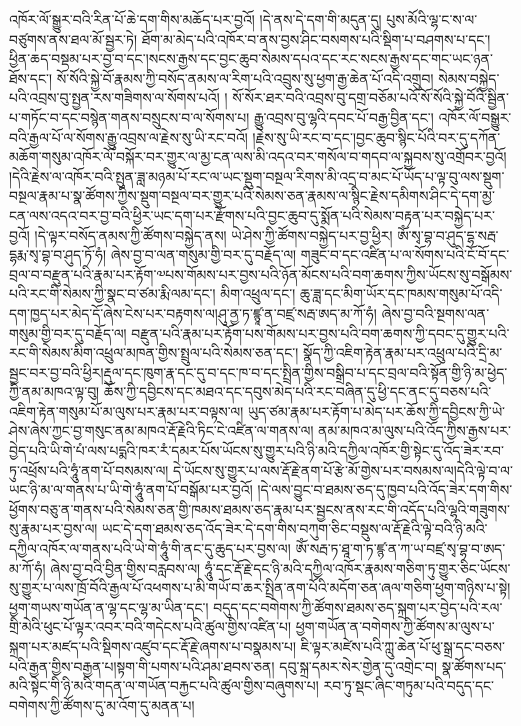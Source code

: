 འཁོར་ལོ་སྒྱུར་བའི་རིན་པོ་ཆེ་དག་གིས་མཆོད་པར་བྱའོ། །དེ་ནས་དེ་དག་གི་མདུན་དུ། པུས་མོའི་ལྷ་ང་ས་ལ་བཙུགས་ནས་ཐལ་མོ་སྦྱར་ཏེ། ཐོག་མ་མེད་པའི་འཁོར་བ་ནས་བྱས་ཤིང་བསགས་པའི་སྡིག་པ་བཤགས་པ་དང་། ཕྱིན་ཆད་བསྡམ་པར་བྱ་བ་དང་།སངས་རྒྱས་དང་བྱང་ཆུབ་སེམས་དཔའ་དང་རང་སངས་རྒྱས་དང་གང་ཡང་ཉན་ཐོས་དང་། སོ་སོའི་སྐྱེ་བོ་རྣམས་ཀྱི་བསོད་ནམས་ལ་རིག་པའི་འབྲུས་སུ་ཕྱག་རྒྱ་ཆེན་པོ་འདི་འགྲུབ། སེམས་བསྐྱེད་པའི་འབྲས་བུ་སྤྱན་རས་གཟིགས་ལ་སོགས་པའོ། ། སོ་སོར་ཐར་བའི་འབྲས་བུ་དགྲ་བཅོམ་པའོ་སོ་སོའི་སྐྱེ་བོའི་སྦྱིན་པ་གཏོང་བ་དང་བསྙེན་གནས་བསྲུངས་བ་ལ་སོགས་པ། རྒྱུ་འབྲས་བུ་ལྷའི་དབང་པོ་བརྒྱ་བྱིན་དང་། འཁོར་ལོ་བསྒྱུར་བའི་རྒྱལ་པོ་ལ་སོགས་རྒྱུ་འབྲས་ལ་རྗེས་སུ་ཡི་རང་བའོ། །རྗེས་སུ་ཡི་རང་བ་དང་།བྱང་ཆུབ་སྙིང་པོའི་བར་དུ་དཀོན་མཆོག་གསུམ་འཁོར་ལོ་བསྐོར་བར་གྱུར་ལ་མྱ་ངན་ལས་མི་འདའ་བར་གསོལ་བ་གདབ་ལ་སྐྱབས་སུ་འགྲོབར་བྱའོ། །དེའི་རྗེས་ལ་འཁོར་བའི་སྤུན་ཟླ་མཉམ་པོ་རང་ལ་ཡང་སྡུག་བསྔལ་རིགས་མི་འདྲ་བ་མང་པོ་ཡོད་པ་ལྟ་བུ་ལས་སྡུག་བསྔལ་རྣམ་པ་སྣ་ཚོགས་ཀྱིས་སྡུག་བསྔལ་བར་གྱུར་པའི་སེམས་ཅན་རྣམས་ལ་སྙིང་རྗེས་དམིགས་ཤིང་དེ་དག་མྱ་ངན་ལས་འདའ་བར་བྱ་བའི་ཕྱིར་ཡང་དག་པར་རྫོགས་པའི་བྱང་ཆུབ་དུ་སྨོན་པའི་སེམས་བརྟན་པར་བསྐྱེད་པར་བྱའོ། །དེ་ལྟར་བསོད་ནམས་ཀྱི་ཚོགས་བསྐྱེད་ནས། ཡེ་ཤེས་ཀྱི་ཚོགས་བསྐྱེད་པར་བྱ་ཕྱིར། ཨོཾ་སྭ་བྷ་བ་ཤུད་དྷ་སརྦ་དྷརྨ་སྭ་བྷ་བ་ཤུད་ཏོ་ཧཾ། ཞེས་བྱ་བ་ལན་གསུམ་གྱི་བར་དུ་བརྗོད་ལ། གཟུང་བ་དང་འཛིན་པ་ལ་སོགས་པའི་ངོ་བོ་དང་བྲལ་བ་བརྫུན་པའི་རྣམ་པར་རྟོག་༧པས་གོམས་པར་བྱས་པའི་ཉོན་མོངས་པའི་བག་ཆགས་ཀྱིས་ཡོངས་སུ་བསྒོམས་པའི་རང་གི་སེམས་ཀྱི་སྣང་བ་ཙམ་རྨི་ལམ་དང་། མིག་འཕྲུལ་དང་། ཆུ་ཟླ་དང་མིག་ཡོར་དང་ཁམས་གསུམ་པོ་འདི་དག་ཁྱད་པར་མེད་དོ་ཞེས་ངེས་པར་བརྟགས་ལ།ཤུ་ནྱ་ཏ་ཛྙཱ་ན་བཛྲ་སརྦ་ཨད་མ་ཀོ་ཧཾ། ཞེས་བྱ་བའི་སྔགས་ལན་གསུམ་གྱི་བར་དུ་བརྗོད་ལ། བརྫུན་པའི་རྣམ་པར་རྟོག་པས་གོམས་པར་བྱས་པའི་བག་ཆགས་ཀྱི་དབང་དུ་གྱུར་པའི་རང་གི་སེམས་མིག་འཕྲུལ་མཁན་གྱིས་སྤྲུལ་པའི་སེམས་ཅན་དང་། སྣོད་ཀྱི་འཇིག་རྟེན་རྣམ་པར་འཕྲུལ་པའི་དྲི་མ་སྦྱང་བར་བྱ་བའི་ཕྱིར།རྡུལ་དང་ཁུག་རྣ་དང་དུ་བ་དང་ཁ་བ་དང་སྤྲིན་གྱིས་བསྒྲིབ་པ་དང་བྲལ་བའི་སྟོན་གྱི་ཉི་མ་ཕྱེད་ཀྱི་ནམ་མཁའ་ལྟ་བུ། ཆོས་ཀྱི་དབྱིངས་དང་མཐའ་དང་དབུས་མེད་པའི་རང་བཞིན་དུ་ཕྱི་དང་ནང་དུ་བཅས་པའི་འཇིག་རྟེན་གསུམ་པོ་མ་ལུས་པར་རྣམ་པར་བལྟས་ལ། ཡུད་ཙམ་རྣམ་པར་རྟོག་པ་མེད་པར་ཆོས་ཀྱི་དབྱིངས་ཀྱི་ཡེ་ཤེས་ཞེས་ཀྱང་བྱ་གསུང་ནམ་མཁའ་རྡོ་རྗེའི་ཏིང་ངེ་འཛིན་ལ་གནས་ལ། ནམ་མཁའ་མ་ལུས་པའི་འོད་ཀྱིས་རྒྱས་པར་བྱེད་པའི་ཡི་གེ་པཾ་ལས་པདྨའི་ཁར་རཾ་དམར་པོས་ཡོངས་སུ་གྱུར་པའི་ཉི་མའི་དཀྱིལ་འཁོར་གྱི་སྟེང་དུ་འོད་ཟེར་རབ་ཏུ་འཕྲོས་པའི་ཧཱུཾ་ནག་པོ་བསམས་ལ། དེ་ཡོངས་སུ་གྱུར་པ་ལས་རྡོ་རྗེ་ནག་པོ་རྩེ་མོ་གྱེས་པར་བསམས་ལ།དེའི་ལྟེ་བ་ལ་ཡང་ཉི་མ་ལ་གནས་པ་ཡི་གེ་ཧཱུཾ་ནག་པོ་བསྒོམ་པར་བྱའོ། །དེ་ལས་བྱུང་བ་ཐམས་ཅད་དུ་ཁྱབ་པའི་འོད་ཟེར་དག་གིས་ཕྱོགས་བཅུ་ན་གནས་པའི་སེམས་ཅན་གྱི་ཁམས་ཐམས་ཅད་རྣམ་པར་སྦྱངས་ནས་རང་གི་འདོད་པའི་ལྷའི་གཟུགས་སུ་རྣམ་པར་བྱས་ལ། ཡང་དེ་དག་ཐམས་ཅད་འོད་ཟེར་དེ་དག་གིས་བཀུག་ཅིང་བསྡུས་ལ་རྡོ་རྗེའི་ལྟེ་བའི་ཉི་མའི་དཀྱིལ་འཁོར་ལ་གནས་པའི་ཡེ་གེ་ཧཱུཾ་གི་ནང་དུ་ཆུད་པར་བྱས་ལ། ཨོཾ་སརྦ་ཏ་ཐཱ་ག་ཏ་ཛྙ་ན་ཀ་ཡ་བཛྲ་སྭ་བྷ་བ་ཨད་མ་ཀོ་ཧཾ། ཞེས་བྱ་བའི་བྱིན་གྱིས་བརླབས་ལ། ཧཱུཾ་དང་རྡོ་རྗེ་དང་ཉི་མའི་དཀྱིལ་འཁོར་རྣམས་གཅིག་ཏུ་གྱུར་ཅིང་ཡོངས་སུ་གྱུར་པ་ལས་ཁྲོ་བོའི་རྒྱལ་པོ་འཕགས་པ་མི་གཡོ་བ་ཆར་སྤྲིན་ནག་པོའི་མདོག་ཅན་ཞལ་གཅིག་ཕྱག་གཉིས་པ་སྟེ། ཕྱག་གཡས་གཡོན་ན་ལྷ་དང་ལྷ་མ་ཡིན་དང་། བདུད་དང་བགེགས་ཀྱི་ཚོགས་ཐམས་ཅད་སྐྲག་པར་བྱེད་པའི་རལ་གྲི་མེའི་ཕུང་པོ་ལྟར་འབར་བའི་གདེངས་པའི་ཚུལ་གྱིས་འཛིན་པ། ཕྱག་གཡོན་ན་བགེགས་ཀྱི་ཚོགས་མ་ལུས་པ་སྐྲག་པར་མཛད་པའི་སྡིགས་འཛུབ་དང་རྡོ་རྗེ་ཞགས་པ་བསྣམས་པ། ཇི་ལྟར་མཛེས་པའི་ཀླུ་ཆེན་པོ་ཕུ་སྒྲ་དང་བཅས་པའི་རྒྱན་གྱིས་བརྒྱན་པ།སྟག་གི་པགས་པའི་ཤམ་ཐབས་ཅན། དབུ་སྐྲ་དམར་སེར་གྱེན་དུ་འགྲེང་བ། སྣ་ཚོགས་པད་མའི་སྟེང་གི་ཉི་མའི་གདན་ལ་གཡོན་བརྐྱང་པའི་ཚུལ་གྱིས་བཞུགས་པ། རབ་ཏུ་སྡང་ཞིང་གཏུམ་པའི་བདུད་དང་བགེགས་ཀྱི་ཚོགས་དུ་མ་འོག་དུ་མནན་པ། 
